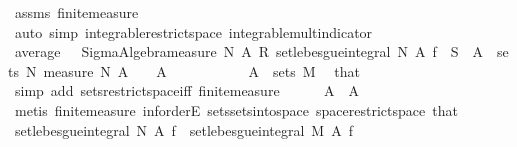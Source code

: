 \begin{isabellebody}
\ assms\ finite{\isacharunderscore}{\kern0pt}measure\ \isamarkupfalse%
\ {\isacharparenleft}{\kern0pt}auto\ simp{\isacharcolon}{\kern0pt}\ integrable{\isacharunderscore}{\kern0pt}restrict{\isacharunderscore}{\kern0pt}space\ integrable{\isacharunderscore}{\kern0pt}mult{\isacharunderscore}{\kern0pt}indicator{\isacharparenright}{\kern0pt}\isanewline
\ \ \isamarkupfalse%
\ average{\isacharcolon}{\kern0pt}\ {\isachardoublequoteopen}{\isacharparenleft}{\kern0pt}{}\ {\isacharslash}{\kern0pt}\ Sigma{\isacharunderscore}{\kern0pt}Algebra{\isachardot}{\kern0pt}measure\ N\ A{\isacharparenright}{\kern0pt}\ {\isacharasterisk}{\kern0pt}\isactrlsub R\ set{\isacharunderscore}{\kern0pt}lebesgue{\isacharunderscore}{\kern0pt}integral\ N\ A\ f\ {\isasymin}\ S{\isachardoublequoteclose}\ \ {\isachardoublequoteopen}A\ {\isasymin}\ sets\ N{\isachardoublequoteclose}\ {\isachardoublequoteopen}measure\ N\ A\ {\isachargreater}{\kern0pt}\ {}{\isachardoublequoteclose}\ \ A\isanewline
\ \ \isamarkupfalse%
\ {\isacharminus}{\kern0pt}\isanewline
\ \ \ \ \isamarkupfalse%
\ {\isacharasterisk}{\kern0pt}{\isacharcolon}{\kern0pt}\ {\isachardoublequoteopen}A\ {\isasymin}\ sets\ M{\isachardoublequoteclose}\ \isamarkupfalse%
\ that\ \isamarkupfalse%
\ {\isacharparenleft}{\kern0pt}simp\ add{\isacharcolon}{\kern0pt}\ sets{\isacharunderscore}{\kern0pt}restrict{\isacharunderscore}{\kern0pt}space{\isacharunderscore}{\kern0pt}iff\ finite{\isacharunderscore}{\kern0pt}measure{\isacharparenright}{\kern0pt}\isanewline
\ \ \ \ \isamarkupfalse%
\ {\isachardoublequoteopen}A\ {\isacharequal}{\kern0pt}\ A\ {\isasyminter}\ {\isasymOmega}{\isachardoublequoteclose}\ \isamarkupfalse%
\ {\isacharparenleft}{\kern0pt}metis\ finite{\isacharunderscore}{\kern0pt}measure{\isacharparenleft}{\kern0pt}{}{\isacharcomma}{\kern0pt}{}{\isacharparenright}{\kern0pt}\ inf{\isachardot}{\kern0pt}orderE\ sets{\isachardot}{\kern0pt}sets{\isacharunderscore}{\kern0pt}into{\isacharunderscore}{\kern0pt}space\ space{\isacharunderscore}{\kern0pt}restrict{\isacharunderscore}{\kern0pt}space\ that{\isacharparenleft}{\kern0pt}{}{\isacharparenright}{\kern0pt}{\isacharparenright}{\kern0pt}\isanewline
\ \ \ \ \isamarkupfalse%
\ {\isachardoublequoteopen}set{\isacharunderscore}{\kern0pt}lebesgue{\isacharunderscore}{\kern0pt}integral\ N\ A\ f\ {\isacharequal}{\kern0pt}\ set{\isacharunderscore}{\kern0pt}lebesgue{\isacharunderscore}{\kern0pt}integral\ M\ A\ f{\isachardoublequoteclose}\ \isamarkupfalse%

\end{isabellebody}
